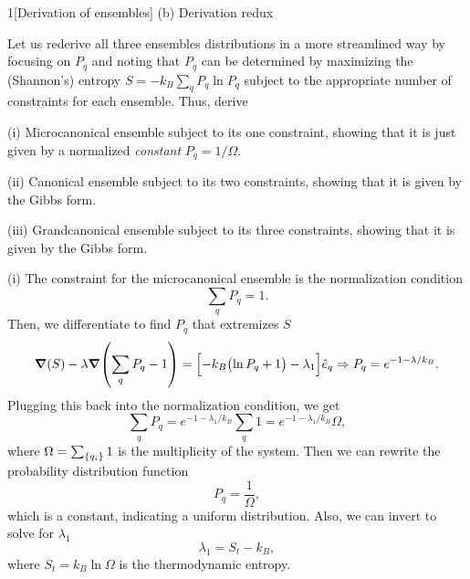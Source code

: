 \documentclass[12pt]{article}
\begin{document}
\begin{problem}{1}[Derivation of ensembles]
(b) Derivation redux

Let us rederive all three ensembles distributions in a more streamlined way by
focusing on $P_q$ and noting that $P_q$ can be determined by maximizing the
(Shannon's) entropy $S=-k_B\sum_qP_q\ln P_q$ subject to the appropriate number
of constraints for each ensemble. Thus, derive

\qquad(i) Microcanonical ensemble subject to its one constraint, showing that it
is just given by a normalized \textit{constant} $P_q=1/\Omega$.

\qquad(ii) Canonical ensemble subject to its two constraints, showing that it 
is given by the Gibbs form.

\qquad(iii) Grandcanonical ensemble subject to its three constraints, showing
that it is given by the Gibbs form.
\begin{solution}
\qquad(i) The constraint for the microcanonical ensemble is the normalization
condition
\begin{equation}\label{p1b:normalization_condition}
    \sum_qP_q=1 .
\end{equation}
Then, we differentiate to find $P_q$ that extremizes $S$
\begin{equation}
   \grad(S)-\lambda\grad\qty(\sum_qP_q-1)
   =\qty[-k_B\qty(\ln P_q+1)-\lambda_1]\hat{e}_q
   \Rightarrow P_q=e^{-1-\lambda/k_B}.
\end{equation}
Plugging this back into the normalization condition, we get
\begin{equation}
    \sum_qP_q=e^{-1-\lambda_1/k_B}\sum_q1
    =e^{-1-\lambda_1/k_B}\Omega,
\end{equation}
where $\Omega=\sum_\qty{q_i}1$ is the multiplicity of the system. Then we can
rewrite the probability distribution function
\begin{equation}
    P_q=\frac1\Omega, 
\end{equation}
which is a constant, indicating a uniform distribution. Also, we can invert to
solve for $\lambda_1$
\begin{equation}
    \lambda_1=S_t-k_B, 
\end{equation}
where $S_t=k_B\ln\Omega$ is the thermodynamic entropy.


\end{solution}
\end{problem}
\end{document}
